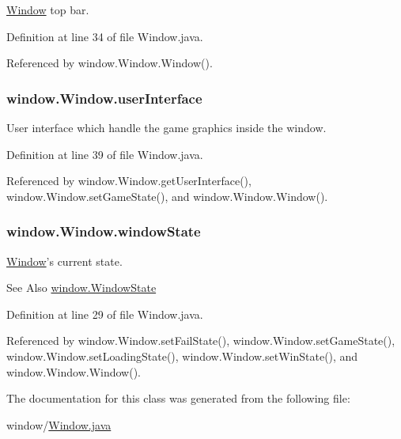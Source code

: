 \hyperlink{a00037}{Window} top bar. 



Definition at line 34 of file Window.\-java.



Referenced by window.\-Window.\-Window().

\hypertarget{a00037_a0021ebc966e051019f4f7c5e4984e77f}{
\subsubsection[{user\-Interface}]{ window.\-Window.\-user\-Interface\hspace{0.3cm}{\ttfamily [protected]}}}\label{a00037_a0021ebc966e051019f4f7c5e4984e77f}


User interface which handle the game graphics inside the window. 



Definition at line 39 of file Window.\-java.



Referenced by window.\-Window.\-get\-User\-Interface(), window.\-Window.\-set\-Game\-State(), and window.\-Window.\-Window().

\hypertarget{a00037_aaf636394a965f1a77233071375d4fe44}{
\subsubsection[{window\-State}]{ window.\-Window.\-window\-State\hspace{0.3cm}{\ttfamily [protected]}}}\label{a00037_aaf636394a965f1a77233071375d4fe44}


\hyperlink{a00037}{Window}'s current state. 

\begin{DoxySeeAlso}{See Also}
\hyperlink{a00038}{window.\-Window\-State} 
\end{DoxySeeAlso}


Definition at line 29 of file Window.\-java.



Referenced by window.\-Window.\-set\-Fail\-State(), window.\-Window.\-set\-Game\-State(), window.\-Window.\-set\-Loading\-State(), window.\-Window.\-set\-Win\-State(), and window.\-Window.\-Window().



The documentation for this class was generated from the following file\-:\begin{DoxyCompactItemize}
\item 
window/\hyperlink{a00057}{Window.\-java}\end{DoxyCompactItemize}

